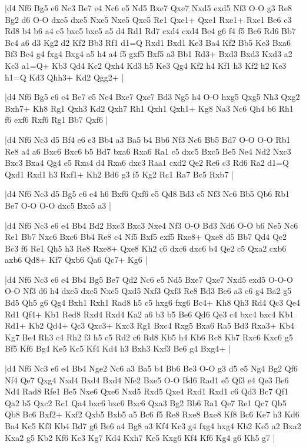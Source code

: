 \whitename{}
\blackname{}
\makegametitle
|d4 Nf6 Bg5 e6 Nc3 Be7 e4 Nc6 e5 Nd5 Bxe7 Qxe7 Nxd5 exd5 Nf3 O-O g3 Re8 Bg2 d6 O-O dxe5 dxe5 Nxe5 Nxe5 Qxe5 Re1 Qxe1+ Qxe1 Rxe1+ Rxe1 Be6 c3 Rd8 b4 b6 a4 c5 bxc5 bxc5 a5 d4 Rd1 Rd7 cxd4 cxd4 Be4 g6 f4 f5 Bc6 Rd6 Bb7 Bc4 a6 d3 Kg2 d2 Kf2 Bb3 Rf1 d1=Q Rxd1 Bxd1 Ke3 Ba4 Kf2 Bb5 Ke3 Bxa6 Bf3 Bc4 g4 fxg4 Bxg4 a5 h4 a4 f5 gxf5 Bxf5 a3 Bb1 Rd3+ Bxd3 Bxd3 Kxd3 a2 Kc3 a1=Q+ Kb3 Qd4 Kc2 Qxh4 Kd3 h5 Ke3 Qg4 Kf2 h4 Kf1 h3 Kf2 h2 Ke3 h1=Q Kd3 Qhh3+ Kd2 Qgg2+  |

\whitename{}
\blackname{}
\makegametitle
|d4 Nf6 Bg5 e6 e4 Be7 e5 Ne4 Bxe7 Qxe7 Bd3 Ng5 h4 O-O hxg5 Qxg5 Nh3 Qxg2 Bxh7+ Kh8 Rg1 Qxh3 Kd2 Qxh7 Rh1 Qxh1 Qxh1+ Kg8 Na3 Nc6 Qh4 b6 Rh1 f6 exf6 Rxf6 Rg1 Bb7 Qxf6  |

\whitename{}
\blackname{}
\makegametitle
|d4 Nf6 Nc3 d5 Bf4 e6 e3 Bb4 a3 Ba5 b4 Bb6 Nf3 Nc6 Bb5 Bd7 O-O O-O Rb1 Re8 a4 a6 Bxc6 Bxc6 b5 Bd7 bxa6 Rxa6 Ra1 c5 dxc5 Bxc5 Be5 Ne4 Nd2 Nxc3 Bxc3 Bxa4 Qg4 e5 Rxa4 d4 Rxa6 dxc3 Raa1 cxd2 Qe2 Re6 c3 Rd6 Ra2 d1=Q Qxd1 Rxd1 h3 Rxf1+ Kh2 Bd6 g3 f5 Kg2 Rc1 Ra7 Bc5 Rxb7  |

\whitename{}
\blackname{}
\makegametitle
|d4 Nf6 Nc3 d5 Bg5 e6 e4 h6 Bxf6 Qxf6 e5 Qd8 Bd3 c5 Nf3 Nc6 Bb5 Qb6 Rb1 Be7 O-O O-O dxc5 Bxc5 a3  |

\whitename{}
\blackname{}
\makegametitle
|d4 Nf6 Nc3 e6 e4 Bb4 Bd2 Bxc3 Bxc3 Nxe4 Nf3 O-O Bd3 Nd6 O-O b6 Ne5 Nc6 Re1 Bb7 Nxc6 Bxc6 Bb4 Re8 c4 Nf5 Bxf5 exf5 Rxe8+ Qxe8 d5 Bb7 Qd4 Qe2 Bc3 f6 Re1 Qh5 h3 Re8 Rxe8+ Qxe8 Kh2 c6 dxc6 dxc6 b4 Qe2 c5 Qxa2 cxb6 axb6 Qd8+ Kf7 Qxb6 Qa6 Qc7+ Kg6  |

\whitename{}
\blackname{}
\makegametitle
|d4 Nf6 Nc3 e6 e4 Bb4 Bg5 Be7 Qd2 Nc6 e5 Nd5 Bxe7 Qxe7 Nxd5 exd5 O-O-O O-O Nf3 d6 h4 dxe5 dxe5 Nxe5 Qxd5 Nxf3 Qxf3 Re8 Bd3 Be6 a3 c6 g4 Ba2 g5 Bd5 Qh5 g6 Qg4 Bxh1 Rxh1 Rad8 h5 c5 hxg6 fxg6 Bc4+ Kh8 Qh3 Rd4 Qc3 Qe4 Rd1 Qf4+ Kb1 Red8 Rxd4 Rxd4 Ka2 a6 b3 b5 Be6 Qd6 Qe3 c4 bxc4 bxc4 Kb1 Rd1+ Kb2 Qd4+ Qc3 Qxc3+ Kxc3 Rg1 Bxc4 Rxg5 Bxa6 Ra5 Bd3 Rxa3+ Kb4 Kg7 Be4 Rh3 c4 Rh2 f3 h5 c5 Rd2 c6 Rd8 Kb5 h4 Kb6 Rc8 Kb7 Rxc6 Kxc6 g5 Bf5 Kf6 Bg4 Ke5 Kc5 Kf4 Kd4 h3 Bxh3 Kxf3 Be6 g4 Bxg4+  |

\whitename{}
\blackname{}
\makegametitle
|d4 Nf6 Nc3 e6 e4 Bb4 Nge2 Nc6 a3 Ba5 b4 Bb6 Be3 O-O g3 d5 e5 Ng4 Bg2 Qf6 Nf4 Qe7 Qxg4 Nxd4 Bxd4 Bxd4 Nfe2 Bxe5 O-O Bd6 Rad1 e5 Qf3 e4 Qe3 Be6 Nd4 Rad8 Rfe1 Be5 Nxe6 Qxe6 Nxd5 Rxd5 Qxe4 Rxd1 Rxd1 c6 Qd3 Bc7 Qf1 Qa2 b5 Qxc2 Rc1 Qa4 bxc6 bxc6 Bxc6 Qxa3 Bg2 Bb6 Ra1 Qe7 Re1 Qc7 Qb5 Qb8 Bc6 Bxf2+ Kxf2 Qxb5 Bxb5 a5 Bc6 f5 Re8 Rxe8 Bxe8 Kf8 Bc6 Ke7 h3 Kd6 Ba4 Kc5 Kf3 Kb4 Bd7 g6 Be6 a4 Bg8 a3 Kf4 Kc3 g4 fxg4 hxg4 Kb2 Ke5 a2 Bxa2 Kxa2 g5 Kb2 Kf6 Kc3 Kg7 Kd4 Kxh7 Ke5 Kxg6 Kf4 Kf6 Kg4 g6 Kh5 g7  |

